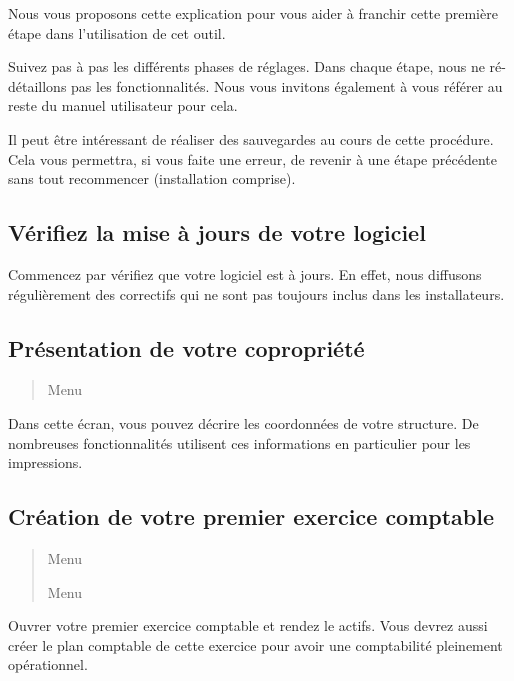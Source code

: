 \documentclass[a4paper,10pt,oneside,french]{sphinxmanual}
\begin{document}
Nous vous proposons cette explication pour vous aider à franchir cette première étape dans l’utilisation de cet outil.

Suivez pas à pas les différents phases de réglages. Dans chaque étape, nous ne ré-détaillons pas les fonctionnalités. Nous vous invitons également à vous référer au reste du manuel utilisateur pour cela.

Il peut être intéressant de réaliser des sauvegardes au cours de cette procédure.
Cela vous permettra, si vous faite une erreur, de revenir à une étape précédente sans tout recommencer (installation comprise).


\subsection{Vérifiez la mise à jours de votre logiciel}
\label{\detokenize{syndic/first_step:verifiez-la-mise-a-jours-de-votre-logiciel}}
Commencez par vérifiez que votre logiciel est à jours.
En effet, nous diffusons régulièrement des correctifs qui ne sont pas toujours inclus dans les installateurs.


\subsection{Présentation de votre copropriété}
\label{\detokenize{syndic/first_step:presentation-de-votre-copropriete}}\begin{quote}

Menu 
\end{quote}

Dans cette écran, vous pouvez décrire les coordonnées de votre structure.
De nombreuses fonctionnalités utilisent ces informations en particulier pour les impressions.


\subsection{Création de votre premier exercice comptable}
\label{\detokenize{syndic/first_step:creation-de-votre-premier-exercice-comptable}}\begin{quote}

Menu 

Menu 
\end{quote}

Ouvrer votre premier exercice comptable et rendez le actifs.
Vous devrez aussi créer le plan comptable de cette exercice pour avoir une comptabilité pleinement opérationnel.
\end{document}
